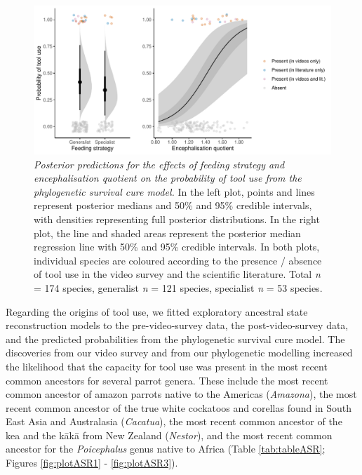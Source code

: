 \documentclass[
  man, donotrepeattitle,floatsintext]{apa6}
\begin{document}
\begin{figure}
\centering
\includegraphics{manuscript_files/figure-latex/plotSurvCure4-1.pdf}
\caption{\label{fig:plotSurvCure4}\emph{Posterior predictions for the effects of feeding
strategy and encephalisation quotient on the probability of tool use from the
phylogenetic survival cure model.} In the left plot, points and lines represent
posterior medians and 50\% and 95\% credible intervals, with densities
representing full posterior distributions. In the right plot, the line and
shaded areas represent the posterior median regression line with 50\% and 95\%
credible intervals. In both plots, individual species are coloured according to
the presence / absence of tool use in the video survey and the scientific
literature. Total \emph{n} = 174 species, generalist \emph{n} =
121 species, specialist \emph{n} =
53 species.}
\end{figure}

Regarding the origins of tool use, we fitted exploratory ancestral state
reconstruction models to the pre-video-survey data, the post-video-survey data,
and the predicted probabilities from the phylogenetic survival cure model. The
discoveries from our video survey and from our phylogenetic modelling increased
the likelihood that the capacity for tool use was present in the most recent
common ancestors for several parrot genera. These include the most recent common
ancestor of amazon parrots native to the Americas (\emph{Amazona}), the most recent
common ancestor of the true white cockatoos and corellas found in South East
Asia and Australasia (\emph{Cacatua}), the most recent common ancestor of the kea and
the kākā from New Zealand (\emph{Nestor}), and the most recent common ancestor for
the \emph{Poicephalus} genus native to Africa (Table \ref{tab:tableASR};
Figures \ref{fig:plotASR1} - \ref{fig:plotASR3}).
\end{document}
